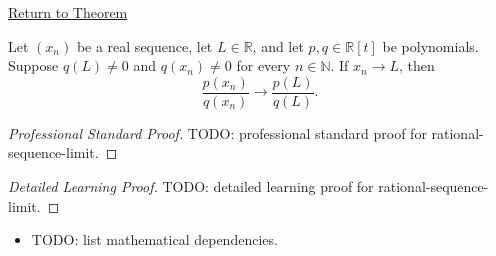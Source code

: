 \newpage
{}
\label{prf:rational-sequence-limit}

\begin{remark*}[Return]
\hyperref[thm:rational-sequence-limit]{Return to Theorem}
\end{remark*}

\begin{theorem*}
Let $(x_n)$ be a real sequence, let $L\in\mathbb{R}$, and let
$p,q\in\mathbb{R}[t]$ be polynomials. Suppose $q(L)\neq 0$ and
$q(x_n)\neq 0$ for every $n\in\mathbb{N}$. If $x_n\to L$, then
\[
\frac{p(x_n)}{q(x_n)}\to \frac{p(L)}{q(L)}.
\]

\smallskip
\noindent
\end{theorem*}

\begin{proof}[Professional Standard Proof]
\LRAProofBodyStart
TODO: professional standard proof for rational-sequence-limit.
\end{proof}

\begin{proof}[Detailed Learning Proof]
\LRAProofBodyStart
TODO: detailed learning proof for rational-sequence-limit.
\end{proof}

\begin{remark*}
\end{remark*}

\begin{dependencies}
\begin{itemize}
  \item TODO: list mathematical dependencies.
\end{itemize}
\end{dependencies}

\clearpage
